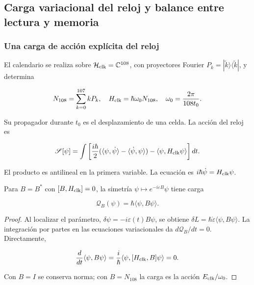 \subsection{Carga variacional del reloj y balance entre lectura y memoria}

\subsubsection{Una carga de acción explícita del reloj}

El calendario se realiza sobre \(\mathcal H_{\rm clk}=\mathbb C^{108}\), con proyectores Fourier \(P_k=|\widetilde k\rangle\langle\widetilde k|\), y determina

\begin{equation}
N_{108}=\sum_{k=0}^{107}kP_k,\quad
H_{\rm clk}=\hbar\omega_0N_{108},\quad
\omega_0=\frac{2\pi}{108t_0}.
\label{nuc07:eq:12}
\end{equation}

Su propagador durante \(t_0\) es el desplazamiento de una celda. La acción del reloj es

\begin{equation}
\mathscr S[\psi]=\int
\left[\frac{i\hbar}{2}
(\langle\psi,\dot\psi\rangle-\langle\dot\psi,\psi\rangle)
-\langle\psi,H_{\rm clk}\psi\rangle\right]dt.
\label{nuc07:eq:13}
\end{equation}

El producto es antilineal en la primera variable. La ecuación es \(i\hbar\dot\psi=H_{\rm clk}\psi\).

\begin{proposition}
Para \(B=B^*\) con \([B,H_{\rm clk}]=0\), la simetría \(\psi\mapsto e^{-i\varepsilon B}\psi\) tiene carga

\begin{equation}
\mathcal Q_B(\psi)=\hbar\langle\psi,B\psi\rangle.
\label{nuc07:eq:14}
\end{equation}
\end{proposition}

\begin{proof}
Al localizar el parámetro, \(\delta\psi=-i\varepsilon(t)B\psi\), se obtiene
\(\delta L=\hbar\dot\varepsilon\langle\psi,B\psi\rangle\).
La integración por partes en las ecuaciones variacionales da \(d\mathcal Q_B/dt=0\). Directamente,

\[
\frac{d}{dt}\langle\psi,B\psi\rangle
=\frac{i}{\hbar}\langle\psi,[H_{\rm clk},B]\psi\rangle=0.
\]

Con \(B=I\) se conserva norma; con \(B=N_{108}\) la carga es la acción \(E_{\rm clk}/\omega_0\).
\end{proof}

